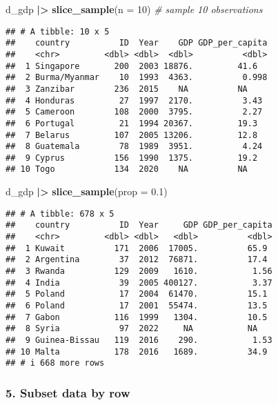 \documentclass[
]{article}
\newenvironment{Shaded}{\begin{snugshade}}{\end{snugshade}}
\newcommand{\AttributeTok}[1]{\textcolor[rgb]{0.13,0.29,0.53}{#1}}
\newcommand{\CommentTok}[1]{\textcolor[rgb]{0.56,0.35,0.01}{\textit{#1}}}
\newcommand{\DecValTok}[1]{\textcolor[rgb]{0.00,0.00,0.81}{#1}}
\newcommand{\FloatTok}[1]{\textcolor[rgb]{0.00,0.00,0.81}{#1}}
\newcommand{\FunctionTok}[1]{\textcolor[rgb]{0.13,0.29,0.53}{\textbf{#1}}}
\newcommand{\NormalTok}[1]{#1}
\newcommand{\SpecialCharTok}[1]{\textcolor[rgb]{0.81,0.36,0.00}{\textbf{#1}}}
\begin{document}
\begin{Shaded}
\begin{Highlighting}[]
\NormalTok{d\_gdp }\SpecialCharTok{|\textgreater{}}
  \FunctionTok{slice\_sample}\NormalTok{(}\AttributeTok{n =} \DecValTok{10}\NormalTok{) }\CommentTok{\# sample 10 observations}
\end{Highlighting}
\end{Shaded}

\begin{verbatim}
## # A tibble: 10 x 5
##    country          ID  Year    GDP GDP_per_capita
##    <chr>         <dbl> <dbl>  <dbl>          <dbl>
##  1 Singapore       200  2003 18876.         41.6  
##  2 Burma/Myanmar    10  1993  4363.          0.998
##  3 Zanzibar        236  2015    NA          NA    
##  4 Honduras         27  1997  2170.          3.43 
##  5 Cameroon        108  2000  3795.          2.27 
##  6 Portugal         21  1994 20367.         19.3  
##  7 Belarus         107  2005 13206.         12.8  
##  8 Guatemala        78  1989  3951.          4.24 
##  9 Cyprus          156  1990  1375.         19.2  
## 10 Togo            134  2020    NA          NA
\end{verbatim}

\begin{Shaded}
\begin{Highlighting}[]
\NormalTok{d\_gdp }\SpecialCharTok{|\textgreater{}}
  \FunctionTok{slice\_sample}\NormalTok{(}\AttributeTok{prop =} \FloatTok{0.1}\NormalTok{) }
\end{Highlighting}
\end{Shaded}

\begin{verbatim}
## # A tibble: 678 x 5
##    country          ID  Year     GDP GDP_per_capita
##    <chr>         <dbl> <dbl>   <dbl>          <dbl>
##  1 Kuwait          171  2006  17005.          65.9 
##  2 Argentina        37  2012  76871.          17.4 
##  3 Rwanda          129  2009   1610.           1.56
##  4 India            39  2005 400127.           3.37
##  5 Poland           17  2004  61470.          15.1 
##  6 Poland           17  2001  55474.          13.5 
##  7 Gabon           116  1999   1304.          10.5 
##  8 Syria            97  2022     NA           NA   
##  9 Guinea-Bissau   119  2016    290.           1.53
## 10 Malta           178  2016   1689.          34.9 
## # i 668 more rows
\end{verbatim}

\hypertarget{subset-data-by-row}{%
\subsubsection{5. Subset data by row}\label{subset-data-by-row}}
\end{document}
